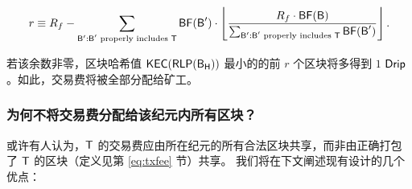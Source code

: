 \begin{align}
	r\equiv R_f - \sum_{\textsf{B}': \text{$\textsf{B}'$ properly includes $\textsf{T}$}} \mathsf{BF}(\textsf{B}') \cdot \left\lfloor\frac{R_f \cdot\mathsf{BF}(\textsf{B})}{\sum_{\textsf{B}': \text{$\textsf{B}'$ properly includes $\textsf{T}$}} \mathsf{BF}(\textsf{B}') }\right\rfloor.
\end{align}

若该余数非零，区块哈希值 $\mathsf{KEC}(\mathsf{RLP}(\textsf{B}_{\textsf{H}}))$ 最小的的前 $r$ 个区块将多得到 $1$ ${\sf Drip}$。如此，交易费将被全部分配给矿工。


\subsubsection{为何不将交易费分配给该纪元内所有区块？}
或许有人认为，$\textsf{T}$ 的交易费应由所在纪元的所有合法区块共享，而非由正确打包了 $\textsf{T}$ 的区块（定义见第 \ref{eq:txfee} 节）共享。
我们将在下文阐述现有设计的几个优点：
